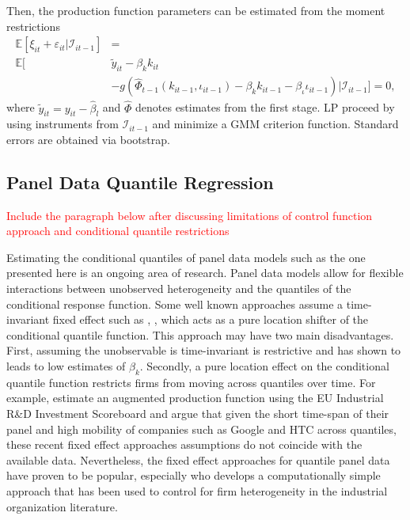 \documentclass[11pt]{article}
\begin{document}
Then, the production function parameters can be estimated from the moment restrictions
\begin{equation}
\begin{split}
\mathbb{E}[\xi_{it}+\varepsilon_{it}|\mathcal{I}_{it-1}]&=\\
\mathbb{E}[&\tilde{y}_{it}-\beta_{k}k_{it}\\
&-g(\hat{\Phi}_{t-1}(k_{it-1}, \iota_{it-1})-\beta_{k}k_{it-1}-\beta_{\iota}\iota_{it-1})|\mathcal{I}_{it-1}]=0,
\end{split}
\end{equation}
where $\tilde{y}_{it}=y_{it}-\hat{\beta}_{l}$ and $\hat{\Phi}$ denotes estimates from the first stage. LP proceed by using instruments from $\mathcal{I}_{it-1}$ and minimize a GMM criterion function. Standard errors are obtained via bootstrap.

\subsection{Panel Data Quantile Regression}

\textcolor{red}{Include the paragraph below after discussing limitations of control function approach and conditional quantile restrictions}

Estimating the conditional quantiles of panel data models such as the one presented here is an ongoing area of research. Panel data models allow for flexible interactions between unobserved heterogeneity and the quantiles of the conditional response function. Some well known approaches assume a time-invariant fixed effect such as \cite{Koenker2004}, \cite{Lamarche2010}, \cite{Canay2011} which acts as a pure location shifter of the conditional quantile function. This approach may have two main disadvantages. First, assuming the unobservable is time-invariant is restrictive and \cite{Griliches1986} has shown to leads to low estimates of $\beta_{k}$. Secondly, a pure location effect on the conditional quantile function restricts firms from moving across quantiles over time. For example, \cite{Montresor2015} estimate an augmented production function using the EU Industrial R\&D Investment Scoreboard and argue that given the short time-span of their panel and high mobility of companies such as Google and HTC across quantiles, these recent fixed effect approaches assumptions do not coincide with the available data. Nevertheless, the fixed effect approaches for quantile panel data have proven to be popular, especially \cite{Canay2011} who develops a computationally simple approach that has been used to control for firm heterogeneity in the industrial organization literature.
\end{document}
